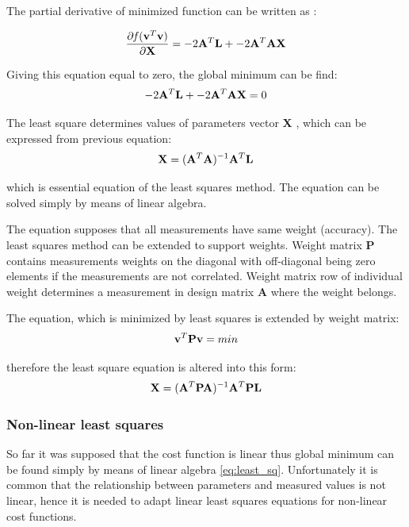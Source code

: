 \documentclass[a4paper,12pt]{article}
\newcommand{\ematr}[1]{
{\bf #1}
}
\newcommand{\evect}[1]{
{\bf #1}
}
\newcommand{\efunc}[1]{
{\it #1}
}
\begin{document}
The partial derivative of minimized function can be written as \cite{mathematicalfrederico}:
 
\begin{equation}
\frac{\partial \efunc{f} (\evect{v}^{T} \evect{v}) }{\partial \evect{X}} = -2\ematr{A}^{T} \evect{L} + -2\ematr{A}^{T}\ematr{A} \evect{X} 
\label{eq:least_part}
\end{equation} 

Giving this equation equal to zero, the global minimum can be find:
\begin{equation}
-2\ematr{A}^{T} \evect{L} + -2\ematr{A}^{T}\ematr{A} \evect{X} = 0 
\end{equation} 

The least square determines values of parameters vector \evect{X}, which can be expressed from previous equation:
\begin{equation}
\evect{X} = (\ematr{A}^{T} \ematr{A})^{-1} \ematr{A}^{T} \ematr{L}
\end{equation}

which is essential equation of the least squares method. The equation can be solved simply by means of linear algebra.

The equation supposes that all measurements have same weight (accuracy). The least squares method can be extended to support weights.
Weight matrix \ematr{P} contains measurements weights on the diagonal with off-diagonal being zero elements if
the measurements are not correlated.
Weight matrix row of individual weight determines a measurement in design matrix \ematr{A} where the weight belongs.

The equation, which is minimized by least squares is extended by weight matrix:
\begin{equation}
\evect{v}^{T}  \ematr{P} \evect{v} = min
\end{equation}

therefore the least square equation is altered into this form:
\begin{equation}
\label{eq:least_sq}
\evect{X} = (\ematr{A}^{T} \ematr{P} \ematr{A})^{-1} \ematr{A}^{T} \ematr{P} \ematr{L}
\end{equation}

\subsubsection{Non-linear least squares}
\label{sec:non_least}
So far it was supposed that the cost function is linear thus global minimum can be found simply by means of linear algebra  \eqref{eq:least_sq}.
Unfortunately it is common that the relationship between parameters and 
measured values is not linear, hence it is needed to adapt linear least squares equations for non-linear
cost functions.
\end{document}
